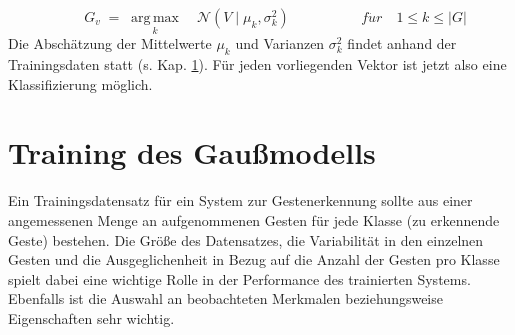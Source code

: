 \begin{equation} \label{finalClassification}
    \qquad \ G_v \; = \; {\underset {k}{\operatorname {arg\,max} }\quad
    \mathcal {N}(V\mid \mu_k ,\sigma^{2}_k)}\qquad \qquad \ \ \ \ \
    f\ddot{u}r\quad 1\leq k\leq |G|
\end{equation}
Die Abschätzung der Mittelwerte $\mu_k$ und Varianzen $\sigma_k^2$ findet anhand der Trainingsdaten statt (s. Kap. \ref{Training}). Für jeden vorliegenden Vektor ist jetzt also eine Klassifizierung möglich. 

\section{Training des Gaußmodells} \label{Training}
Ein Trainingsdatensatz für ein System zur Gestenerkennung sollte aus einer angemessenen Menge an aufgenommenen Gesten für jede Klasse (zu erkennende Geste) bestehen. Die Größe des Datensatzes, die Variabilität in den einzelnen Gesten und die Ausgeglichenheit in Bezug auf die Anzahl der Gesten pro Klasse spielt dabei eine wichtige Rolle in der Performance des trainierten Systems. Ebenfalls ist die Auswahl an beobachteten Merkmalen beziehungsweise Eigenschaften sehr wichtig.~\cite{sampleSize}

